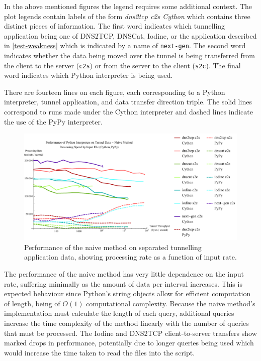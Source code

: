 \documentclass[12pt]{report}
\theoremstyle{remark}
\theoremstyle{definition}
\theoremstyle{definition}
\theoremstyle{definition}
\begin{document}
In the above mentioned figures the legend requires some additional context. The
plot legends contain labels of the form \emph{dns2tcp c2s Cython} which contains
three distinct pieces of information. The first word indicates which tunnelling
application being one of DNS2TCP, DNSCat, Iodine, or the application described
in \ref{test-weakness} which is indicated by a name of \texttt{next-gen}. The
second word indicates whether the data being moved over the tunnel is being
transferred from the client to the server (\texttt{c2s}) or from the server to
the client (\texttt{s2c}). The final word indicates which Python interpreter is
being used.

There are fourteen lines on each figure, each corresponding to a Python
interpreter, tunnel application, and data transfer direction triple. The solid
lines correspond to runs made under the Cython interpreter and dashed lines
indicate the use of the PyPy interpreter.

\begin{figure}
\centering
\includegraphics[width=\textwidth]{../figures/ppia-naive.pdf}
\caption[Performance of Naive Method on Tunnel Data by Python
Interpreter]{Performance of the naive method on separated tunnelling application
data, showing processing rate as a function of input rate.}
\label{ppia-naive}
\end{figure}

The performance of the naive method has very little dependence on the input
rate, suffering minimally as the amount of data per interval increases. This is
expected behaviour since Python's string objects allow for efficient computation of
length, being of $O(1)$ computational complexity\cite{python-strlencplx}.
Because the naive method's implementation must calculate the length of each
query, additional queries increase the time complexity of the method linearly
with the number of queries that must be processed. The Iodine and DNS2TCP
client-to-server transfers show marked drops in performance, potentially due to
longer queries being used which would increase the time taken to read the files
into the script.
\end{document}
